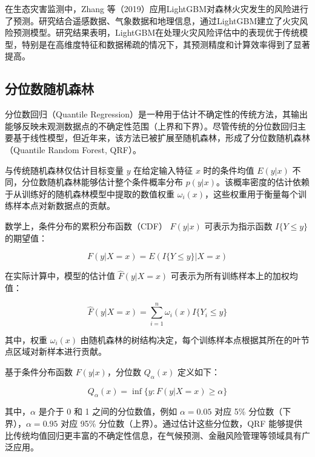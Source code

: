 \documentclass[AutoFakeBold]{LZUThesis-PgD&PhD}
\begin{document}
	在生态灾害监测中，Zhang 等（2019）应用LightGBM对森林火灾发生的风险进行了预测\cite{zhang2019}。研究结合遥感数据、气象数据和地理信息，通过LightGBM建立了火灾风险预测模型。研究结果表明，LightGBM在处理火灾风险评估中的表现优于传统模型，特别是在高维度特征和数据稀疏的情况下，其预测精度和计算效率得到了显著提高。
	
	\subsection{分位数随机森林}
	
	分位数回归（Quantile Regression）是一种用于估计不确定性的传统方法，其输出能够反映未观测数据点的不确定性范围（上界和下界）。尽管传统的分位数回归主要基于线性模型，但近年来，该方法已被扩展至随机森林，形成了分位数随机森林（Quantile Random Forest, QRF）。  
	
	与传统随机森林仅估计目标变量 \( y \) 在给定输入特征 \( x \) 时的条件均值 \( E(y|x) \) 不同，分位数随机森林能够估计整个条件概率分布 \( p(y|x) \)。该概率密度的估计依赖于从训练好的随机森林模型中提取的数值权重 \( \omega_i (x) \)，这些权重用于衡量每个训练样本点对新数据点的贡献。  
	
	数学上，条件分布的累积分布函数（CDF） \( F(y|x) \) 可表示为指示函数 \( I\{Y \leq y\} \) 的期望值：
	
	\begin{equation}
		F(y|X = x) = E (I\{Y \leq y\} |X = x)
	\end{equation}
	
	在实际计算中，模型的估计值 \( \hat{F}(y|X = x) \) 可表示为所有训练样本上的加权均值：
	
	\begin{equation}
		\hat{F}(y|X = x) = \sum_{i=1}^{n} \omega_i (x) I\{Y_i \leq y\}
	\end{equation}
	
	其中，权重 \( \omega_i (x) \) 由随机森林的树结构决定，每个训练样本点根据其所在的叶节点区域对新样本进行贡献。  
	
	基于条件分布函数 \( F(y|x) \)，分位数 \( Q_{\alpha}(x) \) 定义如下：
	
	\begin{equation}
		Q_{\alpha} (x) = \inf \{y : F(y|X = x) \geq \alpha \}
	\end{equation}
	
	其中，\( \alpha \) 是介于 0 和 1 之间的分位数值，例如 \( \alpha = 0.05 \) 对应 5\% 分位数（下界），\( \alpha = 0.95 \) 对应 95\% 分位数（上界）。通过估计这些分位数，QRF 能够提供比传统均值回归更丰富的不确定性信息，在气候预测、金融风险管理等领域具有广泛应用。
\end{document}
